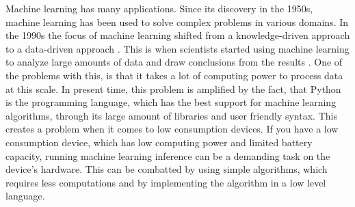 Machine learning has many applications. Since its discovery in the 1950s, machine learning has been used to solve complex problems in various domains. In the 1990s the focus of machine learning shifted from a knowledge-driven approach to a data-driven approach \cite{marr2016short}. This is when scientists started using machine learning to analyze large amounts of data and draw conclusions from the results \cite{marr2016short}. One of the problems with this, is that it takes a lot of computing power to process data at this scale. In present time, this problem is amplified by the fact, that Python is the programming language, which has the best support for machine learning algorithms, through its large amount of libraries and user friendly syntax. This creates a problem when it comes to low consumption devices. If you have a low consumption device, which has low computing power and limited battery capacity, running machine learning inference can be a demanding task on the device's hardware. This can be combatted by using simple algorithms, which requires less computations and by implementing the algorithm in a low level language.
